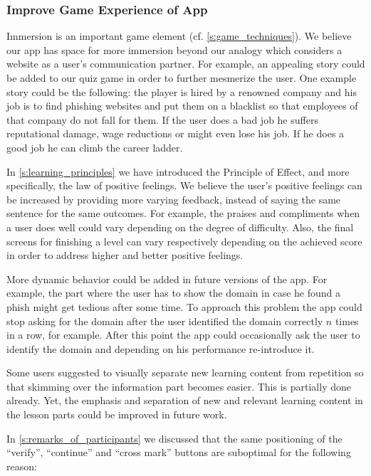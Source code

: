 \subsubsection{Improve Game Experience of App}
\begin{description}[leftmargin=0cm]
	\item[Increase Immersion:] Immersion is an important game element (cf. \autoref{s:game_techniques}).
	We believe our app has space for more immersion beyond our analogy which considers a website as a user's communication partner.
	For example, an appealing story could be added to our quiz game in order to further mesmerize the user. One example story could be the following: the player is hired by a renowned company and his job is to find phishing websites and put them on a blacklist so that employees of that company do not fall for them. If the user does a bad job he suffers reputational damage, wage reductions or might even lose his job. If he does a good job he can climb the career ladder.
	\item[Increase Effect:] In \autoref{s:learning_principles} we have introduced the Principle of Effect, and more specifically, the law of positive feelings. 
	We believe the user's positive feelings can be increased by providing more varying feedback, instead of saying the same sentence for the same outcomes.
	For example, the praises and compliments when a user does well could vary depending on the degree of difficulty.
	Also, the final screens for finishing a level can vary respectively depending on the achieved score in order to address higher and better positive feelings.
	\item[Performance Dependent App Behavior:] More dynamic behavior could be added in future versions of the app.
For example, the part where the user has to show the domain in case he found a phish might get tedious after some time.
To approach this problem the app could stop asking for the domain after the user identified the domain correctly $n$ times in a row, for example.
After this point the app could occasionally ask the user to identify the domain and depending on his performance re-introduce it. 
\item[Text Highlighting:]
Some users suggested to visually separate new learning content from repetition so that skimming over the information part becomes easier. 
This is partially done already. Yet, the emphasis and separation of new and relevant learning content in the lesson parts could be improved in future work.
\item[Improved Button Positioning:] In \autoref{s:remarks_of_participants} we discussed that the same positioning of the ``verify'', ``continue'' and ``cross mark'' buttons are suboptimal for the following reason:

\end{description}
